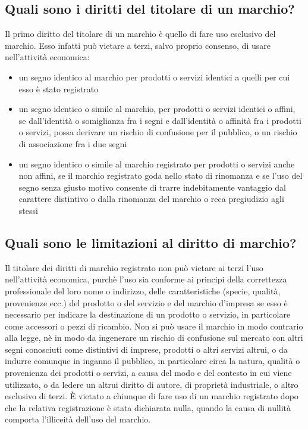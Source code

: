 \subsection{Quali sono i diritti del titolare di un marchio?}
Il primo diritto del titolare di un marchio è quello di fare uso esclusivo del marchio. Esso infatti può vietare a terzi, salvo
proprio consenso, di usare nell'attività economica:
\begin{itemize}
    \item un segno identico al marchio per prodotti o servizi identici a quelli per cui esso è stato registrato
    \item un segno identico o simile al marchio, per prodotti o servizi identici o affini, se dall'identità o somiglianza
    fra i segni e dall'identità o affinità fra i prodotti o servizi, possa derivare un rischio di confusione per il pubblico,
    o un rischio di associazione fra i due segni
    \item un segno identico o simile al marchio registrato per prodotti o servizi anche non affini, se il marchio registrato
    goda nello stato di rinomanza e se l'uso del segno senza giusto motivo consente di trarre indebitamente vantaggio dal carattere
    distintivo o dalla rinomanza del marchio o reca pregiudizio agli stessi
\end{itemize}

\subsection{Quali sono le limitazioni al diritto di marchio?}
Il titolare dei diritti di marchio registrato non può vietare ai terzi l'uso nell'attività economica, purchè l'uso sia conforme ai principi
della correttezza professionale del loro nome o indirizzo, delle caratteristiche (specie, qualità, provenienze ecc.) del prodotto o del servizio e del marchio
d'impresa se esso è necessario per indicare la destinazione di un prodotto o servizio, in particolare come accessori o pezzi di ricambio. \newline
Non si può usare il marchio in modo contrario alla legge, nè in modo da ingenerare un rischio di confusione sul mercato con altri segni
conosciuti come distintivi di imprese, prodotti o altri servizi altrui, o da indurre comunque in inganno il pubblico, in particolare circa la natura,
qualità o provenienza dei prodotti o servizi, a causa del modo e del contesto in cui viene utilizzato, o da ledere un altrui diritto di autore,
di proprietà industriale, o altro esclusivo di terzi. \newline
È vietato a chiunque di fare uso di un marchio registrato dopo che la relativa registrazione è stata dichiarata nulla,
quando la causa di nullità comporta l'illiceità dell'uso del marchio.

